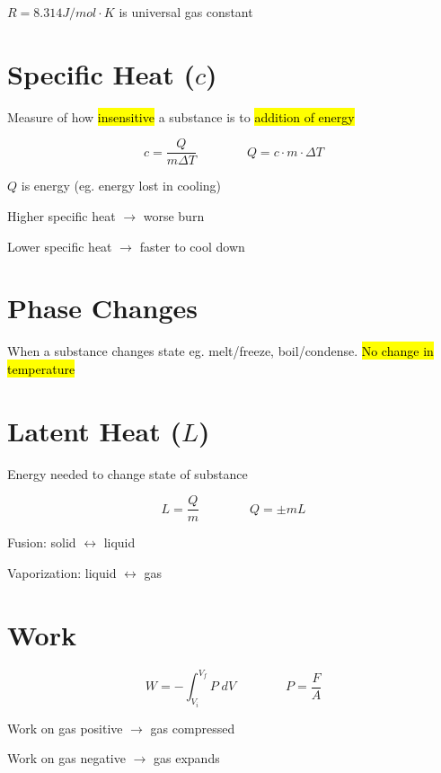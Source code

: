 \documentclass[12pt]{article}
\begin{document}
\begin{spacing}{1.5}
$R = 8.314 J/mol \cdot K$ is universal gas constant

\section{Specific Heat ($c$)}

Measure of how \hl{insensitive} a substance is to \hl{addition of energy}

$$c = \frac{Q}{m \Delta T} \qquad \qquad Q = c \cdot m \cdot \Delta T$$

$Q$ is energy (eg. energy lost in cooling)

\begin{itemize*}
	\item Higher specific heat $\rightarrow$ worse burn
	\item Lower specific heat $\rightarrow$ faster to cool down
\end{itemize*}

\section{Phase Changes}

When a substance changes state eg. melt/freeze, boil/condense. \hl{No change in temperature}

\section{Latent Heat ($L$)}

Energy needed to change state of substance

$$L = \frac{Q}{m} \qquad \qquad Q = \pm mL$$

\begin{itemize*}
	\item Fusion: solid $\leftrightarrow$ liquid
	\item Vaporization: liquid $\leftrightarrow$ gas
\end{itemize*}

\section{Work}

$$W = - \int_{V_i}^{V_f} P \; dV \qquad \qquad P = \frac{F}{A}$$

\begin{itemize*}
	\item Work on gas positive $\rightarrow$ gas compressed
	\item Work on gas negative $\rightarrow$ gas expands 
\end{itemize*}


\end{spacing}
\end{document}
